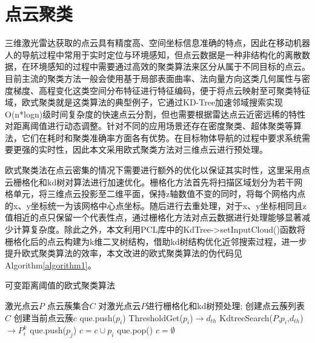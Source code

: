 \section{点云聚类}
三维激光雷达获取的点云具有精度高、空间坐标信息准确的特点，因此在移动机器人的导航过程中常用于实时定位与环境感知，但点云数据是一种非结构化的离散数据，在环境感知的过程中需要通过高效的聚类算法来区分从属于不同目标的点云。目前主流的聚类方法一般会使用基于局部表面曲率、法向量方向这类几何属性与密度梯度、高程变化这类空间分布特征进行特征编码，便于将点云映射至可聚类特征域，欧式聚类就是这类算法的典型例子，它通过KD-Tree加速邻域搜索实现O(n*logn)级时间复杂度的快速点云分割，但也需要根据雷达点云近密远稀的特性对距离阈值进行动态调整。针对不同的应用场景还存在密度聚类、超体聚类等算法，它们在耗时和聚类准确率方面各有优势。在目标物体导航的过程中要求系统需要更强的实时性，因此本文采用欧式聚类\cite{liu2021point}方法对三维点云进行预处理。


欧式聚类法在点云密集的情况下需要进行额外的优化以保证其实时性，这里采用点云栅格化和kd树对算法进行加速优化\cite{guo2023kd}。栅格化方法首先将扫描区域划分为若干网格单元，将三维点云投影至二维平面，保持z轴数值不变的同时，将每个网格内点的x、y坐标统一为该网格中心点坐标。随后进行去重处理，对于x、y坐标相同且z值相近的点只保留一个代表性点，通过栅格化方法对点云数据进行处理能够显著减少计算复杂度。除此之外，本文利用PCL库中的KdTree->setInputCloud()函数将栅格化后的点云构建为k维二叉树结构，借助kd树结构优化近邻搜索过程，进一步提升欧式聚类算法的效率，本文改进的欧式聚类算法的伪代码见Algorithm\ref{algorithm1}。
\begin{algorithm}[!h]
    \caption{可变距离阈值的欧式聚类算法}
    \label{algorithm1}
    \renewcommand{\algorithmicrequire}{\textbf{Input:}}
    \renewcommand{\algorithmicensure}{\textbf{Output:}}
    \renewcommand{\algorithmiccomment}[1]{\hfill $\triangleright$ #1}
    \begin{algorithmic}[1]
        \REQUIRE 激光点云$P$  %
        \ENSURE 点云蔟集合$C$    %
        \STATE  对激光点云$P$进行栅格化和kd树预处理;
        \STATE  创建点云蔟列表$C$
        \STATE  创建当前点云蔟$c$
            \STATE  que.push(${p_i}$)
                \STATE  ThresholdGet(${p_i}$)$ \to {d_{th}}$
                \STATE  KdtreeSearch($P$,${p_i}$,${d_{th}}$)$ \to P_i^k$
                    \STATE  que.push(${p_j}$)
                \ENDFOR
                \STATE  $c = c \cup {p_i}$
                \STATE  que.pop()
            \ENDWHILE
            $c = \emptyset $
        \ENDFOR
    \end{algorithmic}
\end{algorithm}

